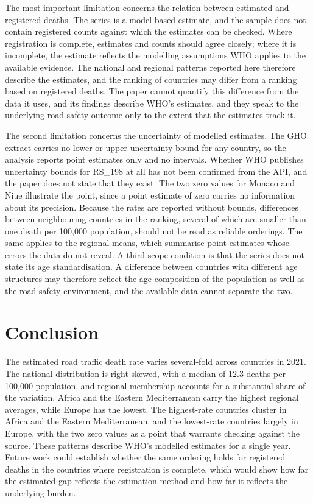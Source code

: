 \documentclass[12pt]{article}
\begin{document}
The most important limitation concerns the relation between estimated and registered deaths. The series is a model-based estimate, and the sample does not contain registered counts against which the estimates can be checked. Where registration is complete, estimates and counts should agree closely; where it is incomplete, the estimate reflects the modelling assumptions WHO applies to the available evidence. The national and regional patterns reported here therefore describe the estimates, and the ranking of countries may differ from a ranking based on registered deaths. The paper cannot quantify this difference from the data it uses, and its findings describe WHO's estimates, and they speak to the underlying road safety outcome only to the extent that the estimates track it.

The second limitation concerns the uncertainty of modelled estimates. The GHO extract carries no lower or upper uncertainty bound for any country, so the analysis reports point estimates only and no intervals. Whether WHO publishes uncertainty bounds for RS\_198 at all has not been confirmed from the API, and the paper does not state that they exist. The two zero values for Monaco and Niue illustrate the point, since a point estimate of zero carries no information about its precision. Because the rates are reported without bounds, differences between neighbouring countries in the ranking, several of which are smaller than one death per 100,000 population, should not be read as reliable orderings. The same applies to the regional means, which summarise point estimates whose errors the data do not reveal. A third scope condition is that the series does not state its age standardisation. A difference between countries with different age structures may therefore reflect the age composition of the population as well as the road safety environment, and the available data cannot separate the two.

\section{Conclusion}

The estimated road traffic death rate varies several-fold across countries in 2021. The national distribution is right-skewed, with a median of 12.3 deaths per 100,000 population, and regional membership accounts for a substantial share of the variation. Africa and the Eastern Mediterranean carry the highest regional averages, while Europe has the lowest. The highest-rate countries cluster in Africa and the Eastern Mediterranean, and the lowest-rate countries largely in Europe, with the two zero values as a point that warrants checking against the source. These patterns describe WHO's modelled estimates for a single year. Future work could establish whether the same ordering holds for registered deaths in the countries where registration is complete, which would show how far the estimated gap reflects the estimation method and how far it reflects the underlying burden.



\end{document}
